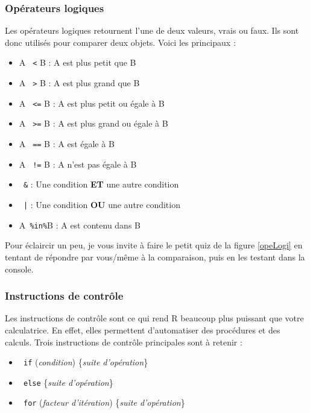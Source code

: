 \documentclass[10.5pt,a4paper]{article}
\newcommand{\rcode}[1]{\texttt{\color{rstudio} #1}}
\begin{document}
    \subsubsection{Opérateurs logiques}
    Les opérateurs logiques retournent l'une de deux valeurs, vrais ou faux. Ils sont donc utilisés pour comparer deux objets. Voici les principaux : 
    \begin{itemize}
      \item A \rcode{<} B    : A est plus petit que B
      \item A \rcode{>} B    : A est plus grand que B
      \item A \rcode{<=} B   : A est plus petit ou égale à B
      \item A \rcode{>=} B   : A est plus grand ou égale à B
      \item A \rcode{==} B   : A est égale à B
      \item A \rcode{!=} B   : A n'est pas égale à B
      \item \rcode{\&}       : Une condition \textbf{ET} une autre condition
      \item \rcode{|}        : Une condition \textbf{OU} une autre condition
      \item A\rcode{\%in\%}B : A est contenu dans B
    \end{itemize}
    
    Pour éclaircir un peu, je vous invite à faire le petit quiz de la figure \ref{opeLogi} en tentant de répondre par vous\-/même à la comparaison, puis en les testant dans la console.
    
    \subsubsection{Instructions de contrôle}
    Les instructions de contrôle sont ce qui rend R beaucoup plus puissant que votre calculatrice. En effet, elles permettent d'automatiser des procédures et des calculs. Trois instructions de contrôle principales sont à retenir :
    
    \begin{itemize}
      \item \rcode{if} (\emph{condition}) \{\emph{suite d'opération}\}
      \item \rcode{else} \{\emph{suite d'opération}\}
      \item \rcode{for} (\emph{facteur d'itération}) \{\emph{suite d'opération}\}
    \end{itemize}
    
\end{document}
